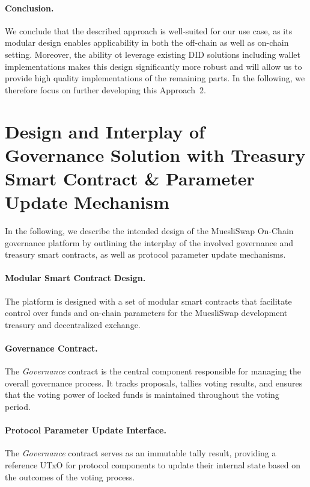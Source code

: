 \documentclass[11pt]{article}
\begin{document}
\paragraph{Conclusion.} We conclude that the described approach is well-suited for our use case, as its modular design enables applicability in both the off-chain as well as on-chain setting. Moreover, the ability ot leverage existing DID solutions including wallet implementations makes this design significantly more robust and will allow us to provide high quality implementations of the remaining parts. In the following, we therefore focus on further developing this Approach~2.

\section{Design and Interplay of Governance Solution with Treasury Smart Contract \& Parameter Update Mechanism}

In the following, we describe the intended design of the MuesliSwap On-Chain governance platform by outlining the interplay of the involved governance and treasury smart contracts, as well as protocol parameter update mechanisms.

\paragraph{Modular Smart Contract Design.} The platform is designed with a set of modular smart contracts that facilitate control over funds and on-chain parameters for the MuesliSwap development treasury and decentralized exchange.

\paragraph{Governance Contract.} The \emph{Governance} contract is the central component responsible for managing the overall governance process. It tracks proposals, tallies voting results, and ensures that the voting power of locked funds is maintained throughout the voting period.

\paragraph{Protocol Parameter Update Interface.} The \emph{Governance} contract serves as an immutable tally result, providing a reference UTxO for protocol components to update their internal state based on the outcomes of the voting process.
\end{document}
